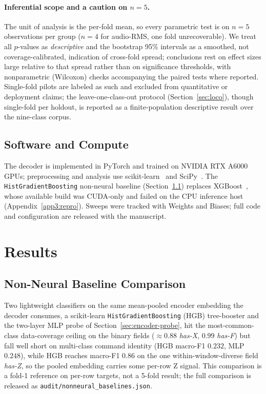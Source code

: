 \documentclass[sensors,article,submit,moreauthors,pdftex]{Definitions/mdpi}
\begin{document}
\paragraph{Inferential scope and a caution on $n=5$.} The unit of analysis is the per-fold mean, so every parametric test is on $n=5$ observations per group ($n=4$ for audio-RMS, one fold unrecoverable). We treat all $p$-values as \emph{descriptive} and the bootstrap 95\% intervals as a smoothed, not coverage-calibrated, indication of cross-fold spread; conclusions rest on effect sizes large relative to that spread rather than on significance thresholds, with nonparametric (Wilcoxon) checks accompanying the paired tests where reported. Single-fold pilots are labeled as such and excluded from quantitative or deployment claims; the leave-one-class-out protocol (Section~\ref{sec:loco}), though single-fold per holdout, is reported as a finite-population descriptive result over the nine-class corpus.

\subsection{Software and Compute}
\label{sec:software}

The decoder is implemented in PyTorch and trained on NVIDIA RTX A6000 GPUs; preprocessing and analysis use scikit-learn~\cite{pedregosa2011sklearn} and SciPy~\cite{virtanen2020scipy}. The \texttt{HistGradientBoosting} non-neural baseline (Section~\ref{sec:results-baseline}) replaces XGBoost~\cite{chen2016xgboost}, whose available build was CUDA-only and failed on the CPU inference host (Appendix~\ref{app3:repro}). Sweeps were tracked with Weights and Biases; full code and configuration are released with the manuscript.

\section{Results}
\label{sec:experiments}

\subsection{Non-Neural Baseline Comparison}
\label{sec:results-baseline}

Two lightweight classifiers on the same mean-pooled encoder embedding the decoder consumes, a scikit-learn \texttt{HistGradientBoosting} (HGB) tree-booster and the two-layer MLP probe of Section~\ref{sec:encoder-probe}, hit the most-common-class data-coverage ceiling on the binary fields ($\approx\!0.88$ \emph{has-X}, $0.99$ \emph{has-F}) but fall well short on multi-class command identity (HGB macro-F1 $0.232$, MLP $0.248$), while HGB reaches macro-F1 $0.86$ on the one within-window-diverse field \emph{has-Z}, so the pooled embedding carries some per-row Z signal. This comparison is a fold-1 reference on per-row targets, not a 5-fold result; the full comparison is released as \texttt{audit/nonneural\_baselines.json}.
\end{document}
